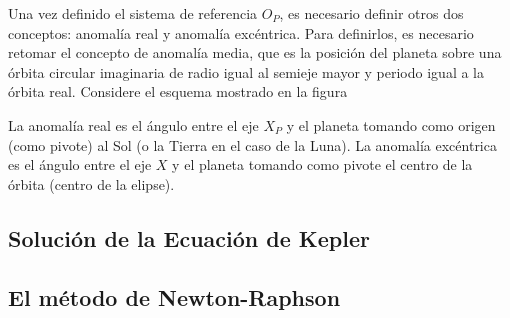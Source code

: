 \documentclass[a4paper,10pt]{article}
\begin{document}
Una vez definido el sistema de referencia $O_P$, es necesario definir otros dos conceptos: anomalía real y anomalía excéntrica. Para definirlos, es necesario retomar el concepto de anomalía media, que es la posición del planeta sobre una órbita circular imaginaria de radio igual al semieje mayor y periodo igual a la órbita real. Considere el esquema mostrado en la figura 

La anomalía real es el ángulo entre el eje $X_P$ y el planeta tomando como origen (como pivote) al Sol (o la Tierra en el caso de la Luna). La anomalía excéntrica es el ángulo entre el eje $X$ y el planeta tomando como pivote el centro de la órbita (centro de la elipse). 

\subsection{Solución de la Ecuación de Kepler}

\subsection{El método de Newton-Raphson}
\end{document}
